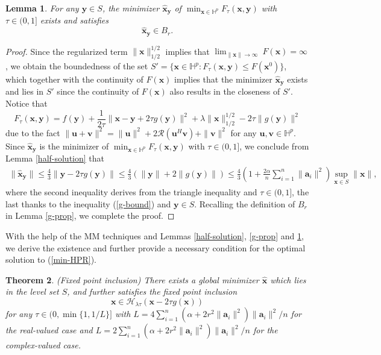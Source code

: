 \documentclass{article}
\newtheorem{theorem}{Theorem}[section]
\newtheorem{lemma}[theorem]{Lemma}
\numberwithin{equation}{section}
\begin{document}
\begin{lemma}\label{Ftau-opt}
	For any $\mathbf{y}\in S$, the minimizer $\hat{\mathbf{x}}_{\mathbf{y}}$ of
	$\min_{\mathbf{x}\in\mathbb{H}^p} F_\tau(\mathbf{x},\mathbf{y})$ with $\tau\in(0,1]$ exists and satisfies
	$$\hat{\mathbf{x}}_{\mathbf{y}}\in B_r.$$
\end{lemma}
\begin{proof}
Since the regularized term $\|\mathbf{x}\|_{1/2}^{1/2}$ implies that $\lim_{\|\mathbf{x}\|\rightarrow\infty}~F(\mathbf{x})=\infty$,
we obtain the boundedness of the set $S'=\{\mathbf{x}\in\mathbb{H}^p: F_\tau(\mathbf{x},\mathbf{y})\leq F(\mathbf{x}^0)\}$, which together with
the continuity of $F(\mathbf{x})$ implies that the minimizer $\hat{\mathbf{x}}_{\mathbf{y}}$ exists and lies in $S'$ since the continuity of $F(\mathbf{x})$ also results in the closeness of $S'$.
Notice that $$F_\tau(\mathbf{x},\mathbf{y})=f(\mathbf{y})+\frac{1}{2\tau}\|\mathbf{x}-\mathbf{y}+2\tau g(\mathbf{y})\|^2+\lambda\|\mathbf{x}\|_{1/2}^{1/2}-2\tau\|g(\mathbf{y})\|^2$$
due to the fact $\|\mathbf{u}+\mathbf{v}\|^2=\|\mathbf{u}\|^2+2\mathcal{R}(\mathbf{u}^H\mathbf{v})+\|\mathbf{v}\|^2$ for any $\mathbf{u},\mathbf{v}\in\mathbb{H}^p$.
Since $\hat{\mathbf{x}}_{\mathbf{y}}$ is the minimizer of
$\min_{\mathbf{x}\in\mathbb{H}^p} F_\tau(\mathbf{x},\mathbf{y})$ with $\tau\in(0,1]$, we conclude from Lemma \ref{half-solution} that
$$\begin{aligned}
	\|\hat{\mathbf{x}}_{\mathbf{y}}\|\leq\frac{4}{3}\|\mathbf{y}-2\tau g(\mathbf{y})\|
	\leq\frac{4}{3}(\|\mathbf{y}\|+2 \|g(\mathbf{y})\|)
	\leq\frac{4}{3}(1+ \frac{2\alpha}{n}\sum_{i=1}^n\|\mathbf{a}_i\|^2)\sup_{\mathbf{x}\in S}\|\mathbf{x}\|,
\end{aligned}$$
where the second inequality derives from the triangle inequality and $\tau\in(0,1]$, the last thanks to the inequality (\ref{g-bound}) and $\mathbf{y}\in S$.
Recalling the definition of $B_r$ in Lemma \ref{g-prop}, we complete the proof.  \end{proof}



With the help of the MM techniques and Lemmas \ref{half-solution}, \ref{g-prop} and \ref{Ftau-opt}, we derive the existence and further provide a necessary condition for the optimal solution to  (\ref{min-HPR}).

\begin{theorem}\label{the1}(Fixed point inclusion)
There exists a global minimizer $\hat{\mathbf{x}}$ which lies in the level set $S$, and further satisfies the fixed point inclusion
 \begin{equation}\label{fpe-hpr}
 \mathbf{x}\in\mathcal{H}_{\lambda\tau}(\mathbf{x}-2\tau g(\mathbf{x}))
\end{equation}
for any $\tau\in(0, \min\{1, 1/L\}]$ with $L=4\sum_{i=1}^n(\alpha+2r^2\|\mathbf{a}_i\|^2)\|\mathbf{a}_i\|^2/n$ for the real-valued case and $L=2\sum_{i=1}^n(\alpha+2r^2\|\mathbf{a}_i\|^2)\|\mathbf{a}_i\|^2/n$ for the complex-valued case.
\end{theorem}
\end{document}
